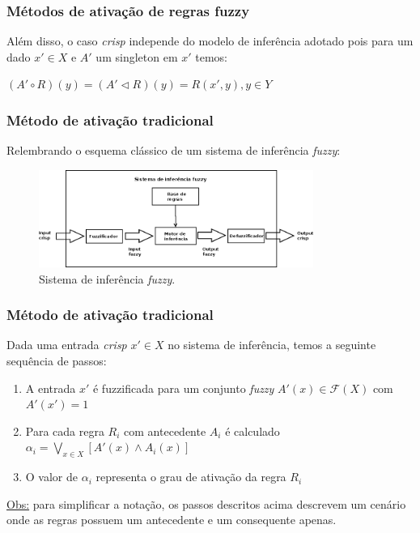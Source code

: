 \documentclass{beamer}
\theoremstyle{definition}
\begin{document}
\begin{frame}
\frametitle{Métodos de ativação de regras fuzzy}
Além disso, o caso \textit{crisp} independe do modelo de inferência adotado pois para um dado $x' \in X$ e $A'$ um singleton em $x'$ temos:
\begin{center}
$(A' \circ R)(y) = (A' \vartriangleleft R)(y) = R(x',y), y \in Y$
\end{center}
\end{frame}

\begin{frame}
\frametitle{Método de ativação tradicional}
Relembrando o esquema clássico de um sistema de inferência \textit{fuzzy}:
\begin{figure}[H]
 \centering
  \includegraphics[width=0.8\textwidth]{FIS.png}
  \caption{Sistema de inferência \textit{fuzzy}.}
  \label{fig:FIS}
\end{figure}
\end{frame}

\begin{frame}
\frametitle{Método de ativação tradicional}
Dada uma entrada \textit{crisp} $x' \in X$ no sistema de inferência, temos a seguinte sequência de passos:
\begin{enumerate}
\item A entrada $x'$ é fuzzificada para um conjunto \textit{fuzzy} $A'(x) \in \mathcal{F}(X)$ com $A'(x')=1$
\item Para cada regra $R_{i}$ com antecedente $A_{i}$ é calculado $\alpha_{i} = \bigvee\limits_{x \in X} [A'(x) \wedge A_{i}(x)]$
\item O valor de $\alpha_{i}$ representa o grau de ativação da regra $R_{i}$
\end{enumerate}
\underline{Obs:} para simplificar a notação, os passos descritos acima descrevem um cenário onde as regras possuem um antecedente e um consequente apenas. 
\end{frame}
\end{document}
